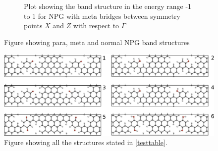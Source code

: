 \begin{figure}
\begin{subfigure}[b]{0.3\textwidth}
		\caption{Plot showing the band structure in the energy range -1 to 1 for NPG with meta bridges between symmetry points \(X\) and \(Z\) with respect to \(\Gamma\)}
		\label{metabs}
	\end{subfigure}
	\caption{Figure showing para, meta and normal NPG band structures}\label{allbands}
\end{figure}
\vspace{-1\baselineskip}
\vspace{\baselineskip}

\begin{figure}
	\centering
	\includegraphics[width=\textwidth]{Figures/Structures.png}
	\caption{Figure showing all the structures stated in \cref{testtable}.}
	\label{Strucow}
\end{figure}

\vspace{-1\baselineskip}
\vspace{\baselineskip}

\vspace{-1\baselineskip}
\vspace{\baselineskip}

